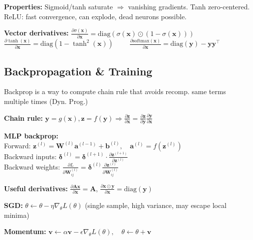 \textbf{Properties:} Sigmoid/tanh saturate $\Rightarrow$ vanishing gradients. Tanh zero-centered. ReLU: fast convergence, can explode, dead neurons possible.

\textbf{Vector derivatives:}
{\footnotesize
$\frac{\partial \sigma(\mathbf{x})}{\partial \mathbf{x}} = \text{diag}(\sigma(\mathbf{x}) \odot (1 - \sigma(\mathbf{x})))$\\
$\frac{\partial \tanh(\mathbf{x})}{\partial \mathbf{x}} = \text{diag}(1 - \tanh^2(\mathbf{x}))$
$\quad\quad \frac{\partial \text{softmax}(\mathbf{x})}{\partial \mathbf{x}} = \text{diag}(\mathbf{y}) - \mathbf{y}\mathbf{y}^\top$}

\subsection{Backpropagation \& Training}

Backprop is a way to compute chain rule that avoids recomp.  same terms multiple times (Dyn. Prog.)

\textbf{Chain rule:} $\mathbf{y} = g(\mathbf{x}), \mathbf{z} = f(\mathbf{y}) \Rightarrow \frac{\partial \mathbf{z}}{\partial \mathbf{x}} = \frac{\partial \mathbf{z}}{\partial \mathbf{y}} \frac{\partial \mathbf{y}}{\partial \mathbf{x}}$

\textbf{MLP backprop:}\\
{ \small
Forward: $\mathbf{z}^{(l)} = \mathbf{W}^{(l)} \mathbf{a}^{(l-1)} + \mathbf{b}^{(l)}, \quad \mathbf{a}^{(l)} = f(\mathbf{z}^{(l)})$\\
Backward inputs: $\boldsymbol{\delta}^{(l)} = \boldsymbol{\delta}^{(l+1)} \cdot \frac{\partial \mathbf{z}^{(l+1)}}{\partial \mathbf{z}^{(l)}}$\\
Backward weights: $\frac{\partial L}{\partial \mathbf{W}_{ij}^{(l)}} = \boldsymbol{\delta}^{(l)} \frac{\partial \mathbf{z}^{(l)}}{\partial \mathbf{W}_{ij}^{(l)}}$}

\textbf{Useful derivatives:} $\frac{\partial \mathbf{A}\mathbf{x}}{\partial \mathbf{x}} = \mathbf{A}$, $\frac{\partial \mathbf{x} \odot \mathbf{y}}{\partial \mathbf{x}} = \text{diag}(\mathbf{y})$

\textbf{SGD:} $\theta \leftarrow \theta - \eta \nabla_\theta L(\theta)$ (single sample, high variance, may escape local minima)

\textbf{Momentum:} $\mathbf{v} \leftarrow \alpha \mathbf{v} - \epsilon \nabla_\theta L(\theta), \quad \theta \leftarrow \theta + \mathbf{v}$


